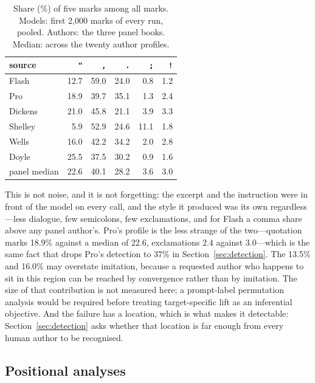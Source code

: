 \documentclass[11pt]{article}
\begin{document}
\begin{table}[htbp]
  \centering
  \caption{Share (\%) of five marks among all marks.  Models: first 2,000
  marks of every run, pooled.  Authors: the three panel books.  Median:
  across the twenty author profiles.}
  \label{tab:corner}
  \begin{tabular}{lrrrrr}
    \toprule
    source & \texttt{"} & \texttt{,} & \texttt{.} & \texttt{;} & \texttt{!} \\
    \midrule
    Flash        & 12.7 & 59.0 & 24.0 & 0.8 & 1.2 \\
    Pro          & 18.9 & 39.7 & 35.1 & 1.3 & 2.4 \\
    \addlinespace
    Dickens      & 21.0 & 45.8 & 21.1 & 3.9 & 3.3 \\
    Shelley      & 5.9  & 52.9 & 24.6 & 11.1 & 1.8 \\
    Wells        & 16.0 & 42.2 & 34.2 & 2.0 & 2.8 \\
    Doyle        & 25.5 & 37.5 & 30.2 & 0.9 & 1.6 \\
    panel median & 22.6 & 40.1 & 28.2 & 3.6 & 3.0 \\
    \bottomrule
  \end{tabular}
\end{table}

This is not noise, and it is not forgetting: the excerpt and the
instruction were in front of the model on every call, and the style it
produced was its own regardless---less dialogue, few semicolons, few
exclamations, and for Flash a comma share above any panel author's.
Pro's profile is the less
strange of the two---quotation marks 18.9\% against a median of 22.6,
exclamations 2.4 against 3.0---which is the same fact that drops Pro's
detection to 37\% in Section~\ref{sec:detection}.
The 13.5\% and 16.0\% may overstate imitation, because a requested author
who happens to sit in this region can be reached by convergence rather
than by imitation.  The size of that contribution is not measured here; a
prompt-label permutation analysis would be required before treating
target-specific lift as an inferential objective.
And the failure has a location, which is what makes it detectable:
Section~\ref{sec:detection} asks whether that location is far enough from
every human author to be recognised.

\subsection{Positional analyses}
\label{sec:positional}
\label{sec:position}
\end{document}
